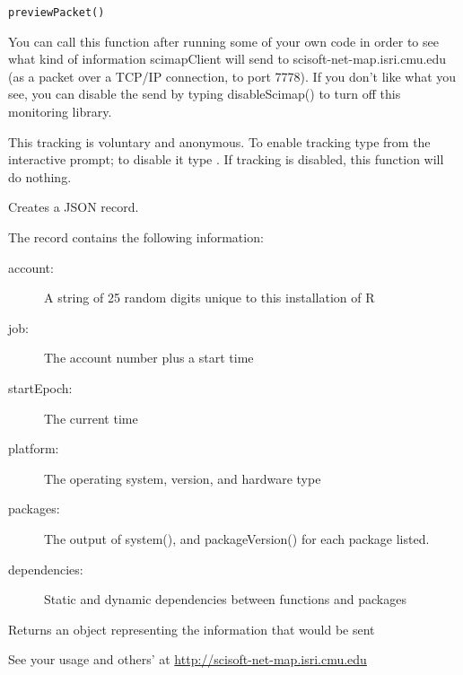 \documentclass[letterpaper]{book}
\begin{document}
%
\begin{Usage}
\begin{verbatim}
previewPacket()
\end{verbatim}
\end{Usage}
%
\begin{Details}\relax
You can call this function after running some of your
own code in order to see what kind of information scimapClient
will send to scisoft-net-map.isri.cmu.edu (as a packet over
a TCP/IP connection, to port 7778). If you don't like what
you see, you can disable the send by typing disableScimap() to
turn off this monitoring library.

This tracking is voluntary and anonymous.  To enable tracking
type  from the interactive prompt; to disable
it type .  If tracking is disabled, this
function will do nothing.

Creates a JSON record.

The record contains the following information:
\begin{description}

\item[account:]  A string of 25 random digits unique to this installation of R 
\item[job:]  The account number plus a start time 
\item[startEpoch:]  The current time 
\item[platform:]  The operating system, version, and hardware type 
\item[packages:]  The output of system(), and packageVersion() for each package listed. 
\item[dependencies:]  Static and dynamic dependencies between functions and packages 

\end{description}

\end{Details}
%
\begin{Value}
Returns an object representing the information that would be sent
\end{Value}
%
\begin{References}\relax
See your usage and others' at \url{http://scisoft-net-map.isri.cmu.edu}
\end{References}
%
\begin{SeeAlso}\relax
{}
\end{SeeAlso}
\end{document}
